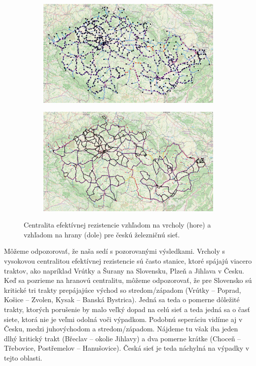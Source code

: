 \documentclass[main.tex]{subfiles}
\begin{document}
\begin{figure}
	\centering
	
	\begin{subfigure}{\linewidth}
		\centering
		\includegraphics[width=\textwidth]{images/cze_vertex_resistance.png}
	\end{subfigure}
	
	\vspace{0.5cm}
	
	\begin{subfigure}{\linewidth}
		\centering
		\includegraphics[width=\textwidth]{images/cze_edge_resistance.png}
	\end{subfigure}
	
	\caption{Centralita efektívnej rezistencie vzhľadom na vrcholy (hore) a vzhľadom na hrany (dole) pre českú železničnú sieť.}
	\label{fig:resistance_cze}
\end{figure}

Môžeme odpozorovať, že naša sedí s pozorovanými výsledkami. Vrcholy s vysokovou centralitou efektívnej rezistencie sú často stanice, ktoré spájajú viacero traktov, ako napríklad Vrútky a Šurany na Slovensku, Plzeň a Jihlava v Česku. Keď sa pozrieme na hranovú centralitu, môžeme odpozorovať, že pre Slovensko sú kritické tri trakty prepájajúce východ so stredom/západom (Vrútky -- Poprad, Košice -- Zvolen, Kysak -- Banská Bystrica). Jedná sa teda o pomerne dôležité trakty, ktorých porušenie by malo veľký dopad na celú sieť a teda jedná sa o časť siete, ktorá nie je veľmi odolná voči výpadkom. Podobnú seperáciu vidíme aj v Česku, medzi juhovýchodom a stredom/západom. Nájdeme tu však iba jeden dlhý kritický trakt (Břeclav -- okolie Jihlavy) a dva pomerne krátke (Choceň -- Třebovice, Postřemelov -- Hanušovice). Česká sieť je teda náchylná na výpadky v tejto oblasti.
\end{document}
